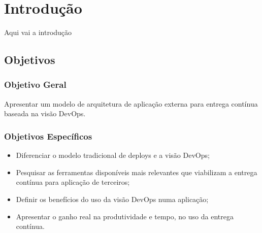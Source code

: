 
\chapter{Introdução}\label{intro}

Aqui vai a introdução



\section{Objetivos}
\subsection{Objetivo Geral }
Apresentar um modelo de arquitetura de aplicação externa para entrega contínua baseada na visão DevOps.



\begin{comment}
Este é um comentário
\end{comment}

\subsection{Objetivos Específicos}
\begin{itemize}
\item Diferenciar o modelo tradicional de deploys e a visão DevOps;

\item Pesquisar as ferramentas disponíveis mais relevantes que viabilizam a entrega contínua para aplicação de terceiros;

\item Definir os benefícios do uso da visão DevOps numa aplicação;

\item Apresentar o ganho real na produtividade e tempo, no uso da entrega contínua.

\end{itemize}
